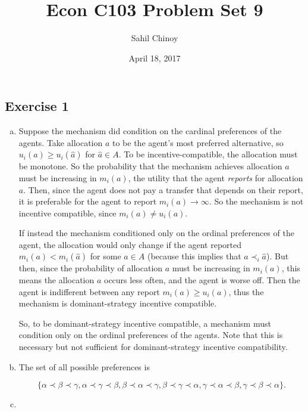 \documentclass{article}
\title{Econ C103 Problem Set 9}
\author{Sahil Chinoy}
\date{April 18, 2017}
\begin{document}
\maketitle{}

\subsection*{Exercise 1}

\begin{enumerate}[(a)]
	
	\item

	Suppose the mechanism did condition on the cardinal preferences of the agents. Take allocation $a$ to be the agent's most preferred alternative, so $u_i(a) \geq u_i(\hat{a})$ for $\hat{a} \in A$. To be incentive-compatible, the allocation must be monotone.  So the probability that the mechanism achieves allocation $a$ must be increasing in $m_i(a)$, the utility that the agent \textit{reports} for allocation $a$. Then, since the agent does not pay a transfer that depends on their report, it is preferable for the agent to report $m_i(a) \to \infty$. So the mechanism is not incentive compatible, since $m_i(a) \neq u_i(a)$.

	If instead the mechanism conditioned only on the ordinal preferences of the agent, the allocation would only change if the agent reported $m_i(a) < m_i(\hat{a})$ for some $\hat{a} \in A$ (because this implies that $a \prec_i \hat{a}$). But then, since the probability of allocation $a$ must be increasing in $m_i(a)$, this means the allocation $a$ occurs less often, and the agent is worse off. Then the agent is indifferent between any report $m_i(a) \geq u_i(a)$, thus the mechanism is dominant-strategy incentive compatible.

	So, to be dominant-strategy incentive compatible, a mechanism must condition only on the ordinal preferences of the agents. Note that this is necessary but not sufficient for dominant-strategy incentive compatibility.

	\item

	The set of all possible preferences is

	$$\{ \alpha \prec \beta \prec \gamma, \alpha \prec \gamma \prec \beta, \beta \prec \alpha \prec \gamma, \beta \prec \gamma \prec \alpha, \gamma \prec \alpha \prec \beta, \gamma \prec \beta \prec \alpha \}.$$

	\item


\end{enumerate}
\end{document}
